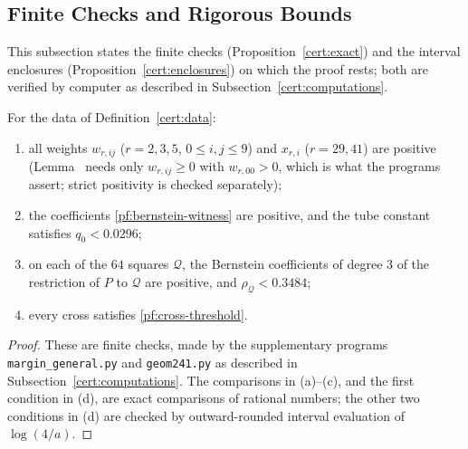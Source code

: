 \subsection{Finite Checks and Rigorous Bounds}

This subsection states the finite checks (Proposition~\ref{cert:exact}) and
the interval enclosures (Proposition~\ref{cert:enclosures}) on which the proof
rests; both are verified by computer as described in
Subsection~\ref{cert:computations}.

\begin{proposition}\label{cert:exact}
For the data of Definition~\ref{cert:data}:
\begin{enumerate}
\item[(a)] all weights $w_{r,ij}$ ($r=2,3,5$, $0\le i,j\le9$) and
 $x_{r,i}$ ($r=29,41$) are positive (Lemma~ needs only
 $w_{r,ij}\ge0$ with $w_{r,00}>0$, which is what the programs assert; strict
 positivity is checked separately);
\item[(b)] the coefficients \eqref{pf:bernstein-witness} are positive,
 and the tube constant satisfies $q_0<0.0296$;
\item[(c)] on each of the $64$ squares $\mathcal Q$, the Bernstein
 coefficients of degree $3$ of the restriction of $P$ to $\mathcal Q$ are
 positive, and $\rho_{\mathcal Q}<0.3484$;
\item[(d)] every cross satisfies \eqref{pf:cross-threshold}.
\end{enumerate}
\end{proposition}

\begin{proof}
These are finite checks, made by the supplementary programs
\texttt{margin\_general.py} and \texttt{geom241.py} as described in
Subsection~\ref{cert:computations}. The comparisons in (a)--(c), and the
first condition in (d), are exact comparisons of rational numbers; the other
two conditions in (d) are checked by outward-rounded interval evaluation of
$\log(4/a)$.
\end{proof}

